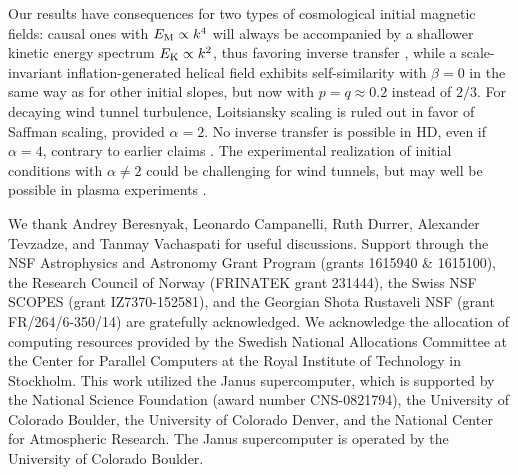 \documentclass[prl,twocolumn,aps,psfig,showpacs,nofootinbib,nobibnotes,superscriptaddress,preprintnumbers,times]{revtex4}
\def\EK{E_{\rm K}}
\def\EM{E_{\rm M}}
\begin{document}
Our results have consequences for two types of cosmological initial
magnetic fields:
causal ones with $\EM\propto k^4$ will always be accompanied by a shallower
kinetic energy spectrum $\EK\propto k^2$, thus favoring inverse transfer
\cite{BKT15,KTBN13}, while a scale-invariant inflation-generated helical
field exhibits self-similarity with $\beta=0$ in the same way as for other
initial slopes, but now with $p=q\approx0.2$ instead of $2/3$.
For decaying wind tunnel turbulence, Loitsiansky scaling is ruled out in
favor of Saffman scaling, provided $\alpha=2$.
No inverse transfer is possible in HD, even if $\alpha=4$,
contrary to earlier claims \cite{Ole97}.
The experimental realization of initial conditions with $\alpha\neq2$
could be challenging for wind tunnels, but may well be possible in
plasma experiments \cite{Forest15}.

\acknowledgements
\vspace{3mm}

We thank Andrey Beresnyak, Leonardo Campanelli, Ruth Durrer, Alexander Tevzadze,
and Tanmay Vachaspati for useful discussions.
Support through the NSF Astrophysics and Astronomy Grant Program
(grants 1615940 \& 1615100), the Research Council of Norway (FRINATEK grant 231444),
the Swiss NSF SCOPES (grant IZ7370-152581), and the Georgian Shota Rustaveli NSF
(grant FR/264/6-350/14) are gratefully acknowledged.
We acknowledge the allocation of computing resources provided by the
Swedish National Allocations Committee at the Center for Parallel
Computers at the Royal Institute of Technology in Stockholm.
This work utilized the Janus supercomputer, which is supported by the
National Science Foundation (award number CNS-0821794), the University
of Colorado Boulder, the University of Colorado Denver, and the National
Center for Atmospheric Research. The Janus supercomputer is operated by
the University of Colorado Boulder.
\end{document}
